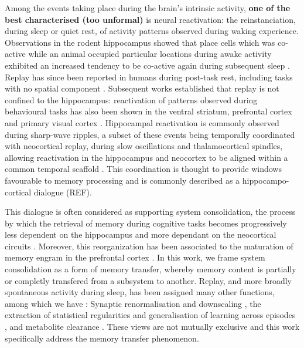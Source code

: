 \documentclass[10pt,letterpaper]{article}
\theoremstyle{plain}
\theoremstyle{remark}
\begin{document}
Among the events taking place during the brain's intrinsic activity, \textbf{one of the best characterised (too unformal)} is neural reactivation: the reinstanciation, during sleep or quiet rest, of activity patterns observed during waking experience. Observations in the rodent hippocampus showed that place cells which was co-active while an animal occupied particular locations during awake activity exhibited an increased tendency to be co-active again during subsequent sleep \cite{wilson1994reactivation}. Replay has since been reported in humans during post-task rest, including tasks with no spatial component \cite{schuck2019sequential,liu2019human}. Subsequent works established that replay is not confined to the hippocampus: reactivation of patterns observed during behavioural tasks has also been shown in the ventral striatum, prefrontal cortex and primary visual cortex \cite{pennartz2004striatum,euston2007pfc,jiwilson2007}. Hippocampal reactivation is commonly observed during sharp-wave ripples, a subset of these events being temporally coordinated with neocortical replay, during slow oscillations and thalamocortical spindles, allowing reactivation in the hippocampus and neocortex to be aligned within a common temporal scaffold \cite{klinzing2019mechanisms,staresina2023coupled}. This coordination is thought to provide windows favourable to memory processing and is commonly described as a hippocampo-cortical dialogue (REF).

This dialogue is often considered as supporting system consolidation, the process by which the retrieval of memory during cognitive tasks becomes progressively less dependent on the hippocampus and more dependant on the neocortical circuits \cite{klinzing2019mechanisms, diekelmann2010memory, squire2015consolidation}. Moreover, this reorganization has been associated to the maturation of memory engram in the prefrontal cortex \cite{kitamura2017engrams}. In this work, we frame system consolidation as a form of memory transfer, whereby memory content is partially or completly transfered from a subsystem to another.
Replay, and more broadly spontaneous activity during sleep, has been assigned many other functions, among which we have : Synaptic renormalisation and downscaling \cite{tononi2014price, tononi2014sleep}, the extraction of statistical regularities and generalisation of learning across episodes \cite{klinzing2019mechanisms}, and metabolite clearance \cite{xie2013sleep}. These views are not mutually exclusive and this work specifically address the memory transfer phenomenon.
\end{document}

